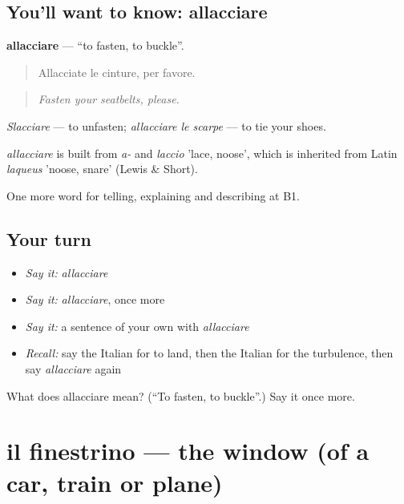 \subsection*{You'll want to know: allacciare}
\textbf{allacciare} — \textquotedblleft{}to fasten, to buckle\textquotedblright{}.

\begin{quote}
Allacciate le cinture, per favore.
\end{quote}

\begin{quote}
\emph{Fasten your seatbelts, please.}
\end{quote}

\emph{Slacciare} — to unfasten; \emph{allacciare le scarpe} — to tie your shoes.

\begin{cousinweb}
\emph{allacciare} is built from \emph{a-} and \emph{laccio} 'lace, noose', which is inherited from Latin \emph{laqueus} 'noose, snare' (Lewis \& Short).
\end{cousinweb}

\begin{grammarlens}[title={What you've built}]
One more word for telling, explaining and describing at B1.
\end{grammarlens}

\subsection*{Your turn}
\begin{itemize}
\raggedright
  \item \emph{Say it:} \emph{allacciare}
  \item \emph{Say it:} \emph{allacciare}, once more
  \item \emph{Say it:} a sentence of your own with \emph{allacciare}
  \item \emph{Recall:} say the Italian for to land, then the Italian for the turbulence, then say \emph{allacciare} again
\end{itemize}

\begin{tcolorbox}[breakable,colback=teal!4,colframe=teal!35!black,title={Before you move on}]
What does allacciare mean? (\textquotedblleft{}To fasten, to buckle\textquotedblright{}.) Say it once more.
\end{tcolorbox}
\section[il finestrino]{il finestrino — the window (of a car, train or plane)}

